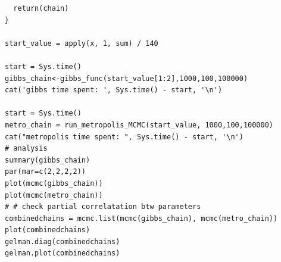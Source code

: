 \documentclass[11pt,a4paper]{article}
\begin{document}
\begin{lstlisting}
  return(chain) 
}

start_value = apply(x, 1, sum) / 140

start = Sys.time()
gibbs_chain<-gibbs_func(start_value[1:2],1000,100,100000)
cat('gibbs time spent: ', Sys.time() - start, '\n')

start = Sys.time()
metro_chain = run_metropolis_MCMC(start_value, 1000,100,100000)
cat("metropolis time spent: ", Sys.time() - start, '\n')
# analysis
summary(gibbs_chain)
par(mar=c(2,2,2,2))
plot(mcmc(gibbs_chain))
plot(mcmc(metro_chain))
# # check partial correlatation btw parameters
combinedchains = mcmc.list(mcmc(gibbs_chain), mcmc(metro_chain))
plot(combinedchains)
gelman.diag(combinedchains)
gelman.plot(combinedchains)
\end{lstlisting}
\end{document}
